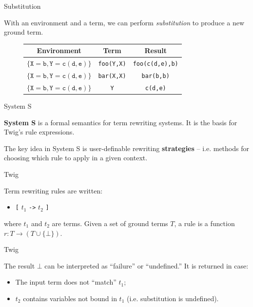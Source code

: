 \documentclass{beamer}
\begin{document}
\begin{frame}[fragile]{Substitution}

With an environment and a term, we can perform \emph{substitution} to produce
a new ground term.

\begin{figure}[h]
\begin{tabular}{|c|c|c|}
\hline
\textbf{Environment} & \textbf{Term} & \textbf{Result}\\
\hline
$\{\mathtt{X}=\mathtt{b},\mathtt{Y}=\mathtt{c(d,e)}\}$ & 
  \texttt{foo(Y,X)} & \texttt{foo(c(d,e),b)} \\
\hline
$\{\mathtt{X}=\mathtt{b},\mathtt{Y}=\mathtt{c(d,e)}\}$ & 
    \texttt{bar(X,X)} & \texttt{bar(b,b)} \\
\hline
$\{\mathtt{X}=\mathtt{b},\mathtt{Y}=\mathtt{c(d,e)}\}$ & 
    \texttt{Y} & \texttt{c(d,e)} \\
\hline
\end{tabular}
\end{figure}

\end{frame}


\begin{frame}{System S}

\textbf{System S} is a formal semantics for term rewriting systems. It is the
basis for Twig's rule expressions.

The key idea in System S is user-definable rewriting \textbf{strategies} --
i.e. methods for choosing which rule to apply in a given context.

\end{frame}


\begin{frame}{Twig}

Term rewriting rules are written:

\begin{itemize}
  \item \texttt{[} $t_1$ \texttt{->} $t_2$ \texttt{]}
\end{itemize}

where $t_1$ and $t_2$ are terms. Given a set of ground terms $T$, a rule is a
function $r : T \to (T \cup \{\bot\})$.

\end{frame}


\begin{frame}{Twig}

The result $\bot$ can be interpreted as ``failure'' or ``undefined.'' It is
returned in case:

\begin{itemize}
  \item The input term does not ``match'' $t_1$;
  \item $t_2$ contains variables not bound in $t_1$ (i.e. substitution is undefined).
\end{itemize}

\end{frame}
\end{document}
